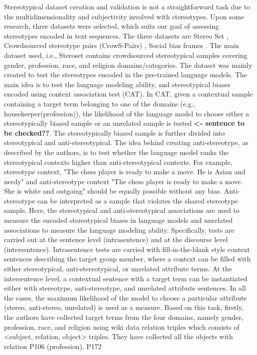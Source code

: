 Stereotypical dataset creation and validation is not a straightforward task due to the multidimensionality and subjectivity involved with stereotypes. Upon some research, three datasets were selected, which suits our goal of assessing stereotypes encoded in text sequences. The three datasets are Stereo Set \cite{nadeem2020stereoset}, Crowdsourced stereotype pairs (CrowS-Pairs) \cite{nangia2020crows}, Social bias frames \cite{sap2019social}. The main dataset used, i.e., Steroset \cite{nadeem2020stereoset} contains crowdsourced stereotypical samples covering gender, profession, race, and religion domains/categories. The dataset was mainly created to test the stereotypes encoded in the pre-trained language models. The main idea is to test the language modeling ability, and stereotypical biases encoded using context association test (CAT). In CAT, given a contextual sample containing a target term belonging to one of the domains (e.g., housekeeper(profession)), the likelihood of the language model to choose either a stereotypically biased sample or an unrelated sample is tested \textbf{<- sentence to be checked??}. The stereotypically biased sample is further divided into stereotypical and anti-stereotypical. The idea behind creating anti-stereotype, as described by the authors, is to test whether the language model ranks the stereotypical contexts higher than anti-stereotypical contexts. For example, stereotype context, "The chess player is ready to make a move. He is Asian and nerdy" and anti-stereotype context "The chess player is ready to make a move. She is white and outgoing" should be equally possible without any bias. Anti-stereotype can be interpreted as a sample that violates the shared stereotype sample. Here, the stereotypical and anti-stereotypical associations are used to measure the encoded stereotypical biases in language models and unrelated associations to measure the language modeling ability. Specifically, tests are carried out at the sentence level (intrasentence) and at the discourse level (intersentence). Intrasentence tests are carried with fill-in-the-blank style context sentences describing the target group member, where a context can be filled with either stereotypical, anti-stereotypical, or unrelated attribute terms. At the intersentence level, a contextual sentence with a target term can be instantiated either with stereotype, anti-stereotype, and unrelated attribute sentences. In all the cases, the maximum likelihood of the model to choose a particular attribute (stereo, anti-stereo, unrelated) is used as a measure. Based on this task, firstly, the authors have collected target terms from the four domains, namely gender, profession, race, and religion using wiki data relation triples \cite{vrandevcic2014wikidata} which consists of <subject, relation, object> triples. They have collected all the objects with relation P106 (profession), P172
